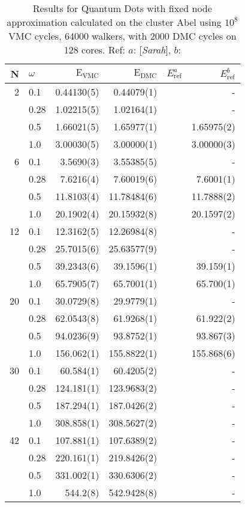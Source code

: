 \begin{table}
\begin{center}
\begin{tabular}{rl|rrrr}
    N     & $\omega$ & $\mathrm{E_{VMC}}$ & $\mathrm{E_{DMC}}$ & $E_\mathrm{ref}^a$& $E_\mathrm{ref}^b$\\
\hline\hline
    2     &   0.1    & 0.44130(5)  & 0.44079(1)  & & -\\
          &   0.28   & 1.02215(5)  & 1.02164(1)  & & - \\
          &   0.5    & 1.66021(5)  & 1.65977(1)  & & 1.65975(2) \\
          &   1.0    & 3.00030(5)  & 3.00000(1)  & & 3.00000(3) \\
\hline
    6     &   0.1    &  3.5690(3)  &  3.55385(5)  & & - \\
          &   0.28   &  7.6216(4)  &  7.60019(6)  & & 7.6001(1)\\ 
          &   0.5    & 11.8103(4)  & 11.78484(6)  & & 11.7888(2) \\
          &   1.0    & 20.1902(4)  & 20.15932(8)  & & 20.1597(2)  \\
\hline
    12    &   0.1    & 12.3162(5)  & 12.26984(8) & & - \\
          &   0.28   & 25.7015(6)  & 25.63577(9) & & - \\
          &   0.5    & 39.2343(6)  & 39.1596(1)  & & 39.159(1) \\
          &   1.0    & 65.7905(7)  & 65.7001(1)  & & 65.700(1)\\
\hline
    20    &   0.1    &  30.0729(8)  &  29.9779(1) & & -\\
          &   0.28   &  62.0543(8)  &  61.9268(1) & & 61.922(2) \\
          &   0.5    &  94.0236(9)  &  93.8752(1) & & 93.867(3) \\
          &   1.0    & 156.062(1)   & 155.8822(1) & & 155.868(6) \\
\hline
    30    &   0.1    &  60.584(1)  &  60.4205(2) & & - \\
          &   0.28   & 124.181(1)  & 123.9683(2) & & -\\
          &   0.5    & 187.294(1)  & 187.0426(2) & & - \\
          &   1.0    & 308.858(1)  & 308.5627(2) & & -\\
\hline
    42    &   0.1    & 107.881(1)  & 107.6389(2) & & -\\
          &   0.28   & 220.161(1)  & 219.8426(2) & & - \\
          &   0.5    & 331.002(1)  & 330.6306(2) & & - \\
          &   1.0    & 544.2(8)    & 542.9428(8) & & - \\
\hline\hline


\end{tabular}
\caption{Results for Quantum Dots with fixed node approximation calculated on the cluster Abel using $10^8$ VMC cycles, $64000$ walkers, with $2000$ DMC cycles on 128 cores. Ref: $a$: [\textit{Sarah}], $b$: \cite{MagnusArticle}}
\end{center}
\end{table}


\cite{inf3331}